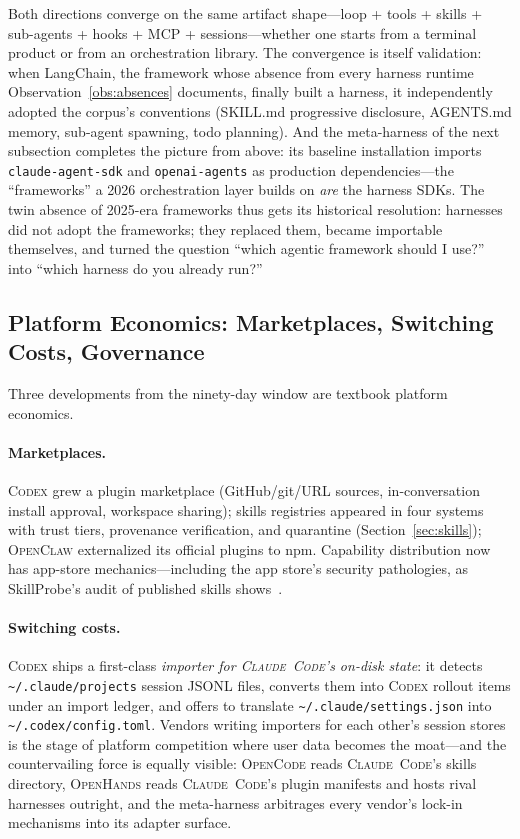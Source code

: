\documentclass[11pt,a4paper]{article}
\newcommand{\clcode}{\textsc{Claude~Code}\xspace}
\newcommand{\cdx}{\textsc{Codex}\xspace}
\newcommand{\oh}{\textsc{OpenHands}\xspace}
\newcommand{\ocl}{\textsc{OpenClaw}\xspace}
\newcommand{\ocd}{\textsc{OpenCode}\xspace}
\begin{document}
Both directions converge on the same artifact shape---loop + tools + skills + sub-agents + hooks + MCP + sessions---whether one starts from a terminal product or from an orchestration library.
The convergence is itself validation: when LangChain, the framework whose absence from every harness runtime Observation~\ref{obs:absences} documents, finally built a harness, it independently adopted the corpus's conventions (SKILL.md progressive disclosure, AGENTS.md memory, sub-agent spawning, todo planning).
And the meta-harness of the next subsection completes the picture from above: its baseline installation imports \texttt{claude-agent-sdk} and \texttt{openai-agents} as production dependencies---the ``frameworks'' a 2026 orchestration layer builds on \emph{are} the harness SDKs.
The twin absence of 2025-era frameworks thus gets its historical resolution: harnesses did not adopt the frameworks; they replaced them, became importable themselves, and turned the question ``which agentic framework should I use?'' into ``which harness do you already run?''

\subsection{Platform Economics: Marketplaces, Switching Costs, Governance}
\label{sec:platform_econ}

Three developments from the ninety-day window are textbook platform economics.

\paragraph{Marketplaces.}
\cdx{} grew a plugin marketplace (GitHub/git/URL sources, in-conversation install approval, workspace sharing); skills registries appeared in four systems with trust tiers, provenance verification, and quarantine (Section~\ref{sec:skills}); \ocl{} externalized its official plugins to npm.
Capability distribution now has app-store mechanics---including the app store's security pathologies, as SkillProbe's audit of published skills shows~\cite{guo2026skillprobe}.

\paragraph{Switching costs.}
\cdx{} ships a first-class \emph{importer for \clcode{}'s on-disk state}: it detects \texttt{\textasciitilde/.claude/projects} session JSONL files, converts them into \cdx{} rollout items under an import ledger, and offers to translate \texttt{\textasciitilde/.claude/settings.json} into \texttt{\textasciitilde/.codex/config.toml}.
Vendors writing importers for each other's session stores is the stage of platform competition where user data becomes the moat---and the countervailing force is equally visible: \ocd{} reads \clcode{}'s skills directory, \oh{} reads \clcode{}'s plugin manifests and hosts rival harnesses outright, and the meta-harness arbitrages every vendor's lock-in mechanisms into its adapter surface.
\end{document}
